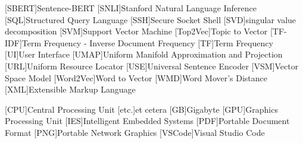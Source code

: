 \begin{acronym}[XXXXXXXXX]
    [SBERT]{Sentence-BERT}
    [SNLI]{Stanford Natural Language Inference}
    [SQL]{Structured Query Language}
    [SSH]{Secure Socket Shell}
    [SVD]{singular value decomposition}
    [SVM]{Support Vector Machine}
    [Top2Vec]{Topic to Vector}
    [TF-IDF]{Term Frequency - Inverse Document Frequency}
    [TF]{Term Frequency}
    [UI]{User Interface}
    [UMAP]{Uniform Manifold Approximation and Projection}
    [URL]{Uniform Resource Locator}
    [USE]{Universal Sentence Encoder}
    [VSM]{Vector Space Model}
    [Word2Vec]{Word to Vector}
    [WMD]{Word Mover's Distance}
    [XML]{Extensible Markup Language}



    \vspace{\parskip}
    [CPU]{Central Processing Unit}
    [etc.]{et cetera}    [GB]{Gigabyte}
    [GPU]{Graphics Processing Unit}
    [IES]{Intelligent Embedded Systems}
    [PDF]{Portable Document Format}
    [PNG]{Portable Network Graphics}
    [VSCode]{Visual Studio Code}

\end{acronym}
